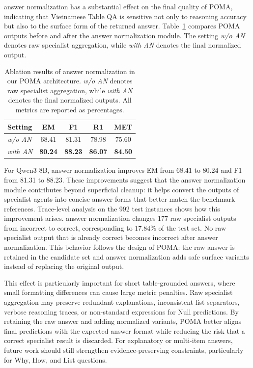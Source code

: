 \documentclass[]{interact}
\begin{document}
answer normalization has a substantial effect on the final quality of POMA, indicating that Vietnamese Table QA is sensitive not only to reasoning accuracy but also to the surface form of the returned answer. Table~\ref{tab:norm-ablation} compares POMA outputs before and after the answer normalization module. The setting \textit{w/o AN} denotes raw specialist aggregation, while \textit{with AN} denotes the final normalized output.

\begin{table}[!t]
\centering
\caption{Ablation results of answer normalization in our POMA architecture. \textit{w/o AN} denotes raw specialist aggregation, while \textit{with AN} denotes the final normalized outputs. All metrics are reported as percentages.}
\label{tab:norm-ablation}
\setlength{\tabcolsep}{12pt}
\begin{tabular}{@{}lcccc@{}}
\toprule
\textbf{Setting} & \textbf{EM} & \textbf{F1} & \textbf{R1} & \textbf{MET} \\
\midrule
\textit{w/o AN}  & 68.41 & 81.31 & 78.98 & 75.60 \\
\textit{with AN} & \textbf{80.24} & \textbf{88.23} & \textbf{86.07} & \textbf{84.50} \\
\bottomrule
\end{tabular}
\end{table}



For Qwen3 8B, answer normalization improves EM from 68.41 to 80.24 and F1 from 81.31 to 88.23. These improvements suggest that the answer normalization module contributes beyond superficial cleanup: it helps convert the outputs of specialist agents into concise answer forms that better match the benchmark references. Trace-level analysis on the 992 test instances shows how this improvement arises. answer normalization changes 177 raw specialist outputs from incorrect to correct, corresponding to 17.84\% of the test set. No raw specialist output that is already correct becomes incorrect after answer normalization. This behavior follows the design of POMA: the raw answer is retained in the candidate set and answer normalization adds safe surface variants instead of replacing the original output.

This effect is particularly important for short table-grounded answers, where small formatting differences can cause large metric penalties. Raw specialist aggregation may preserve redundant explanations, inconsistent list separators, verbose reasoning traces, or non-standard expressions for Null predictions. By retaining the raw answer and adding normalized variants, POMA better aligns final predictions with the expected answer format while reducing the risk that a correct specialist result is discarded. For explanatory or multi-item answers, future work should still strengthen evidence-preserving constraints, particularly for Why, How, and List questions.
\end{document}
